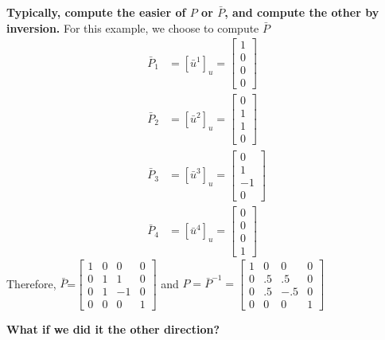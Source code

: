 \documentclass[letterpaper]{article}
\begin{document}
    \textbf{Typically, compute the easier of $P$ or $\bar{P}$, and compute the other by inversion.}
    For this example, we choose to compute $\bar{P}$
    \begin{align*}
        \bar{P}_{1}&=[\bar{u}^{1}]_{u}=\left[\begin{array}{c}
            1\\
            0\\
            0\\
            0
        \end{array}\right]\\
        \bar{P}_{2}&=[\bar{u}^{2}]_{u}=\left[\begin{array}{c}
            0\\
            1\\
            1\\
            0
        \end{array}\right]\\
        \bar{P}_{3}&=[\bar{u}^{3}]_{u}=\left[\begin{array}{c}
            0\\
            1\\
            -1\\
            0
        \end{array}\right]\\
        \bar{P}_{4}&=[\bar{u}^{4}]_{u}=\left[\begin{array}{c}
            0\\
            0\\
            0\\
            1
        \end{array}\right]
    \end{align*}
    Therefore, $\bar{P}$=$\left[\begin{array}{cccc}
        1 & 0 & 0 & 0\\
        0 & 1 & 1 & 0\\
        0 & 1 & -1 & 0\\
        0 & 0 & 0 & 1
    \end{array}\right]$ and $P=\bar{P}^{-1} = \left[\begin{array}{rrrr}
        1 & 0 & 0 & 0\\
        0 & .5 & .5 & 0\\
        0& .5 & -.5 & 0\\
        0 & 0 & 0 & 1
    \end{array}\right]$    


%
    \noindent \textbf{What if we did it the other direction?}
   
\end{document}
